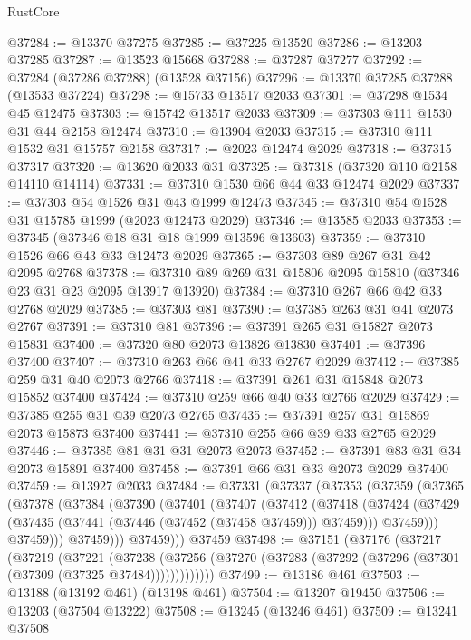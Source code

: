 \begin{lexlean}{RustCore}
\begin{coremodule}
@37284 := @13370 @37275
@37285 := @37225 @13520
@37286 := @13203 @37285
@37287 := @13523 @15668
@37288 := @37287 @37277
@37292 := @37284 (@37286 @37288) (@13528 @37156)
@37296 := @13370 @37285 @37288 (@13533 @37224)
@37298 := @15733 @13517 @2033
@37301 := @37298 @1534 @45 @12475
@37303 := @15742 @13517 @2033
@37309 := @37303 @111 @1530 @31 @44 @2158 @12474
@37310 := @13904 @2033
@37315 := @37310 @111 @1532 @31 @15757 @2158
@37317 := @2023 @12474 @2029
@37318 := @37315 @37317
@37320 := @13620 @2033 @31
@37325 := @37318 (@37320 @110 @2158 @14110 @14114)
@37331 := @37310 @1530 @66 @44 @33 @12474 @2029
@37337 := @37303 @54 @1526 @31 @43 @1999 @12473
@37345 := @37310 @54 @1528 @31 @15785 @1999 (@2023 @12473 @2029)
@37346 := @13585 @2033
@37353 := @37345 (@37346 @18 @31 @18 @1999 @13596 @13603)
@37359 := @37310 @1526 @66 @43 @33 @12473 @2029
@37365 := @37303 @89 @267 @31 @42 @2095 @2768
@37378 := @37310 @89 @269 @31 @15806 @2095 @15810 (@37346 @23 @31 @23 @2095 @13917 @13920)
@37384 := @37310 @267 @66 @42 @33 @2768 @2029
@37385 := @37303 @81
@37390 := @37385 @263 @31 @41 @2073 @2767
@37391 := @37310 @81
@37396 := @37391 @265 @31 @15827 @2073 @15831
@37400 := @37320 @80 @2073 @13826 @13830
@37401 := @37396 @37400
@37407 := @37310 @263 @66 @41 @33 @2767 @2029
@37412 := @37385 @259 @31 @40 @2073 @2766
@37418 := @37391 @261 @31 @15848 @2073 @15852 @37400
@37424 := @37310 @259 @66 @40 @33 @2766 @2029
@37429 := @37385 @255 @31 @39 @2073 @2765
@37435 := @37391 @257 @31 @15869 @2073 @15873 @37400
@37441 := @37310 @255 @66 @39 @33 @2765 @2029
@37446 := @37385 @81 @31 @31 @2073 @2073
@37452 := @37391 @83 @31 @34 @2073 @15891 @37400
@37458 := @37391 @66 @31 @33 @2073 @2029 @37400
@37459 := @13927 @2033
@37484 := @37331
    (@37337
      (@37353
        (@37359
          (@37365
            (@37378
              (@37384
                (@37390
                  (@37401
                    (@37407
                      (@37412
                        (@37418
                          (@37424
                            (@37429 (@37435 (@37441 (@37446 (@37452 (@37458 @37459))) @37459)))
                            @37459)))
                      @37459)))
                @37459)))
          @37459)))
    @37459
@37498 := @37151
    (@37176
      (@37217
        (@37219
          (@37221
            (@37238
              (@37256 (@37270 (@37283 (@37292 (@37296 (@37301 (@37309 (@37325 @37484)))))))))))))
@37499 := @13186 @461
@37503 := @13188 (@13192 @461) (@13198 @461)
@37504 := @13207 @19450
@37506 := @13203 (@37504 @13222)
@37508 := @13245 (@13246 @461)
@37509 := @13241 @37508

\end{coremodule}
\end{lexlean}
